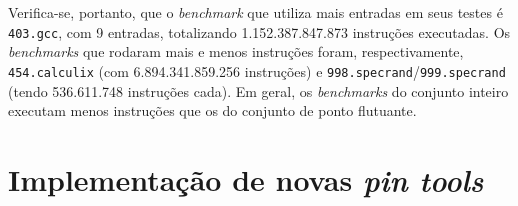 \documentclass[12pt]{article}
\begin{document}

Verifica-se, portanto, que o \textit{benchmark} que utiliza mais entradas em
seus testes é \texttt{403.gcc}, com 9 entradas, totalizando 1.152.387.847.873
instruções executadas. Os \textit{benchmarks} que rodaram mais e menos instruções foram,
respectivamente, \texttt{454.calculix} (com 6.894.341.859.256 instruções) e
\texttt{998.specrand}/\texttt{999.specrand} (tendo 536.611.748 instruções cada).
Em geral, os \textit{benchmarks} do conjunto inteiro executam menos instruções
que os do conjunto de ponto flutuante. 


\section{Implementação de novas \textit{pin tools}} \label{sec:tool}
\end{document}
